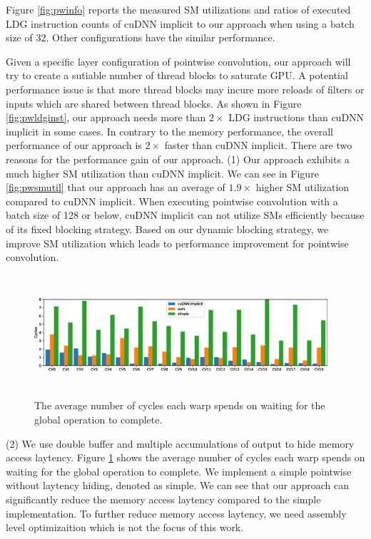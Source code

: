 Figure \ref{fig:pwinfo} reports the measured SM utilizations and ratios of executed LDG instruction counts of cuDNN implicit to our approach when using a batch size of 32. Other configurations have the similar performance. 

Given a specific layer configuration of pointwise convolution, our approach will try to create a sutiable number of thread blocks to saturate GPU. 
A potential performance issue is that more thread blocks may incure more reloads of filters or inputs which are shared between thread blocks. 
As shown in Figure \ref{fig:pwldginst}, our approach needs more than $2\times$ LDG instructions than cuDNN implicit in some cases.
In contrary to the memory performance, the overall performance of our approach is $2\times$ faster than cuDNN implicit.
There are two reasons for the performance gain of our approach. (1) Our approach exhibits a much higher SM utilization than cuDNN implicit.
We can see in Figure \ref{fig:pwsmutil} that our approach has an average of $1.9\times$ higher SM utilization compared to cuDNN implicit.
When executing pointwise convolution with a batch size of 128 or below, cuDNN implicit can not utilize SMs efficiently because of its fixed blocking strategy. 
Based on our dynamic blocking strategy, we improve SM utilization which leads to performance improvement for pointwise convolution.

\begin{figure}
    \centering
    \includegraphics[width=0.97\textwidth,height=4.5cm]{./figure/longscore.eps}
    \caption{The average number of cycles each warp spends on waiting for the global operation to complete.}
    \label{fig:stalllongscore}
\end{figure}

(2) We use double buffer and multiple accumulations of output to hide memory access laytency.
Figure \ref{fig:stalllongscore} shows the average number of cycles each warp spends on waiting for the global operation to complete. 
We implement a simple pointwise without laytency hiding, denoted as simple. 
We can see that our approach can significantly reduce the memory access laytency compared to the simple implementation.
To further reduce memory access laytency, we need assembly level optimizaition which is not the focus of this work.
